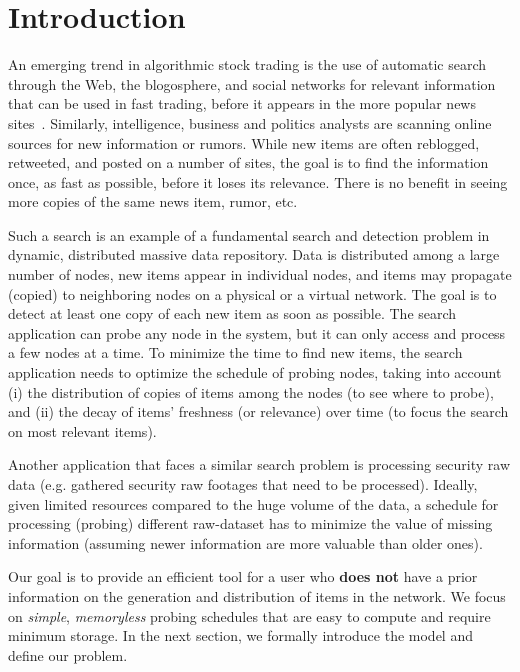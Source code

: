 \section{Introduction}\label{sec:introduction}
An emerging trend in algorithmic stock trading is the use of automatic search through the Web, the blogosphere, and social networks for relevant information that can be used in fast trading, before it appears in the more popular news sites~\cite{Delaney2009,ALPHA2014,AlphaFlash,mitra2011handbook,latar2015robot,wallstreet2015,McKinney2011}. Similarly, intelligence, business and politics analysts are scanning online sources for new information or rumors. While new items are often reblogged, retweeted, and posted on a number of sites, the goal is to find the information once, as fast as possible, before it loses its relevance. There is no benefit in seeing more copies of the same news item, rumor, etc.

Such a search is an example of a fundamental search and detection problem in dynamic, distributed massive data repository.  Data is distributed among a large number of nodes, new items appear in individual nodes, and items may propagate (copied) to neighboring nodes on a physical or a virtual network.  The goal is to detect at least one copy of each new item as soon as possible. The search application can probe any node in the system, but it can only access and process a few nodes at a time. 
To minimize the time to find new items, the search application needs to optimize the schedule of probing nodes, taking into account (i) the  distribution of copies of items among the nodes (to see where to probe), and (ii) the decay of items' freshness (or relevance) over time (to focus the search on most relevant items).


Another application that faces a similar search problem is processing security raw data (e.g. gathered security raw footages that need to be processed). Ideally, given limited resources compared to the huge volume of the data, a schedule for processing (probing) different raw-dataset has to minimize the value of missing information (assuming newer information are more valuable than older ones).

Our goal is to provide an efficient tool for a user who {\bf does not} have a prior information on the generation and distribution of items in the network. We focus on \emph{simple}, \emph{memoryless} probing schedules that are easy to compute and require minimum storage. In the next section, we formally introduce the model and define our problem.


